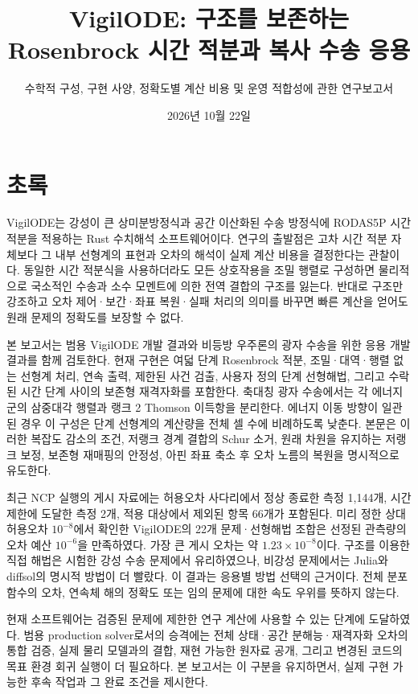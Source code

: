 \documentclass[
  10pt,
  a4paper,
]{article}
\title{VigilODE: 구조를 보존하는 Rosenbrock 시간 적분과 복사 수송 응용}
\subtitle{수학적 구성, 구현 사양, 정확도별 계산 비용 및 운영 적합성에
관한 연구보고서}
\author{}
\date{2026년 10월 22일}
\begin{document}
\maketitle

{
\hypersetup{linkcolor=}
\setcounter{tocdepth}{3}
\tableofcontents
}
\hypertarget{uxcd08uxb85d}{%
\section*{초록}\label{uxcd08uxb85d}}

VigilODE는 강성이 큰 상미분방정식과 공간 이산화된 수송 방정식에 RODAS5P
시간 적분을 적용하는 Rust 수치해석 소프트웨어이다. 연구의 출발점은 고차
시간 적분 자체보다 그 내부 선형계의 표현과 오차의 해석이 실제 계산
비용을 결정한다는 관찰이다. 동일한 시간 적분식을 사용하더라도 모든
상호작용을 조밀 행렬로 구성하면 물리적으로 국소적인 수송과 소수 모멘트에
의한 전역 결합의 구조를 잃는다. 반대로 구조만 강조하고 오차
제어·보간·좌표 복원·실패 처리의 의미를 바꾸면 빠른 계산을 얻어도 원래
문제의 정확도를 보장할 수 없다.

본 보고서는 범용 VigilODE 개발 결과와 비등방 우주론의 광자 수송을 위한
응용 개발 결과를 함께 검토한다. 현재 구현은 여덟 단계 Rosenbrock 적분,
조밀·대역·행렬 없는 선형계 처리, 연속 출력, 제한된 사건 검출, 사용자
정의 단계 선형해법, 그리고 수락된 시간 단계 사이의 보존형 재격자화를
포함한다. 축대칭 광자 수송에서는 각 에너지 군의 삼중대각 행렬과 랭크 2
Thomson 이득항을 분리한다. 에너지 이동 방향이 일관된 경우 이 구성은 단계
선형계의 계산량을 전체 셀 수에 비례하도록 낮춘다. 본문은 이러한 복잡도
감소의 조건, 저랭크 경계 결합의 Schur 소거, 원래 차원을 유지하는 저랭크
보정, 보존형 재매핑의 안정성, 아핀 좌표 축소 후 오차 노름의 복원을
명시적으로 유도한다.

최근 NCP 실행의 게시 자료에는 허용오차 사다리에서 정상 종료한 측정
1,144개, 시간 제한에 도달한 측정 2개, 적용 대상에서 제외된 항목 66개가
포함된다. 미리 정한 상대허용오차 \(10^{-8}\)에서 확인한 VigilODE의 22개
문제·선형해법 조합은 선정된 관측량의 오차 예산 \(10^{-6}\)을 만족하였다.
가장 큰 게시 오차는 약 \(1.23\times10^{-8}\)이다. 구조를 이용한 직접
해법은 시험한 강성 수송 문제에서 유리하였으나, 비강성 문제에서는 Julia와
diffsol의 명시적 방법이 더 빨랐다. 이 결과는 응용별 방법 선택의
근거이다. 전체 분포함수의 오차, 연속체 해의 정확도 또는 임의 문제에 대한
속도 우위를 뜻하지 않는다.

현재 소프트웨어는 검증된 문제에 제한한 연구 계산에 사용할 수 있는 단계에
도달하였다. 범용 production solver로서의 승격에는 전체 상태·공간
분해능·재격자화 오차의 통합 검증, 실제 물리 모델과의 결합, 재현 가능한
원자료 공개, 그리고 변경된 코드의 목표 환경 회귀 실행이 더 필요하다. 본
보고서는 이 구분을 유지하면서, 실제 구현 가능한 후속 작업과 그 완료
조건을 제시한다.
\end{document}
